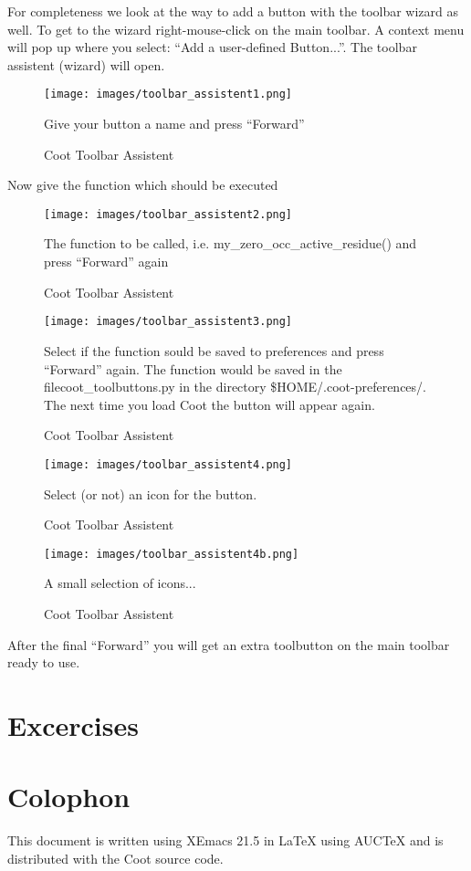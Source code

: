 \documentclass{article}
\begin{document}
For completeness we look at the way to add a button with the toolbar 
wizard as well. To get to the wizard right-mouse-click on the main toolbar.
A context menu will pop up where you select: ``Add a user-defined Button...''.
The toolbar assistent (wizard) will open.
\begin{figure}[htbp]
  \begin{center}
    \leavevmode
    \texttt{[image: images/toolbar\_assistent1.png]}
    \caption{Coot Toolbar Assistent}{Give your button a name and press 
    ``Forward''}
    \label{fig:assistent1}
  \end{center}
\end{figure}

Now give the function which should be executed

\begin{figure}[htbp]
  \begin{center}
    \leavevmode
    \texttt{[image: images/toolbar\_assistent2.png]}
    \caption{Coot Toolbar Assistent}{The function to be called, i.e. my\_zero\_occ\_active\_residue() and press ``Forward'' again}
    \label{fig:assistent2}
  \end{center}
\end{figure}

\begin{figure}[htbp]
  \begin{center}
    \leavevmode
    \texttt{[image: images/toolbar\_assistent3.png]}
    \caption{Coot Toolbar Assistent}{Select if the function sould be saved to preferences and press ``Forward'' again. The function would be saved in the filecoot\_toolbuttons.py in the directory \$HOME/.coot-preferences/. The next time you load Coot the button will appear again.}
    \label{fig:assistent3}
  \end{center}
\end{figure}

\begin{figure}[htbp]
  \begin{center}
    \leavevmode
    \texttt{[image: images/toolbar\_assistent4.png]}
    \caption{Coot Toolbar Assistent}{Select (or not) an icon for the button.}
    \label{fig:assistent3}
  \end{center}
\end{figure}

\begin{figure}[htbp]
  \begin{center}
    \leavevmode
    \texttt{[image: images/toolbar\_assistent4b.png]}
    \caption{Coot Toolbar Assistent}{A small selection of icons...}
    \label{fig:assistent3}
  \end{center}
\end{figure}

After the final ``Forward'' you will get an extra toolbutton on the main
toolbar ready to use.

\section{Excercises}



\section*{Colophon}

This document is written using XEmacs 21.5 in \LaTeX{} using AUC\TeX{}
and is distributed with the Coot source code.
\end{document}
